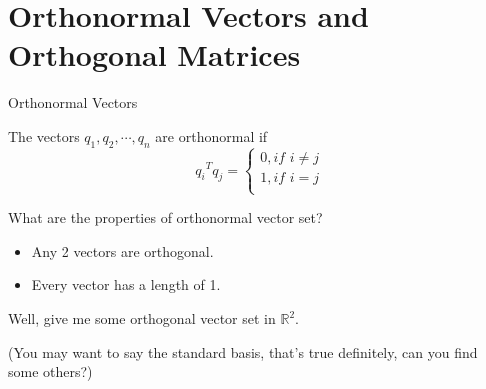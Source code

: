 \documentclass{beamer}
\begin{document}
\section{Orthonormal Vectors and Orthogonal Matrices}
\begin{frame}{Orthonormal Vectors}
\begin{definition}
    The vectors $q_1,q_2,\cdots,q_n$ are orthonormal if
    \begin{equation*}
        {q_i}^Tq_j=\begin{cases}
            0, if\,\,i\ne j\\
            1, if\,\,i=j\\
        \end{cases}
    \end{equation*}
\end{definition}

What are the properties of orthonormal vector set?
\begin{itemize}
    \item Any 2 vectors are orthogonal.
    \item Every vector has a length of 1.
\end{itemize}

Well, give me some orthogonal vector set in $\mathbb{R}^2$.

\vspace{3pt}
(You may want to say the standard basis, that's true definitely, can you find some others?)
\end{frame}
\end{document}
